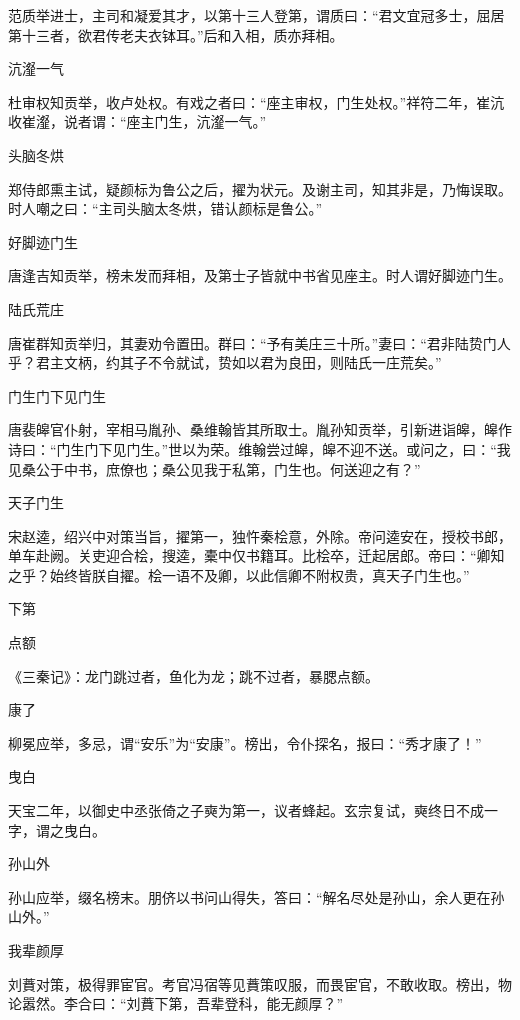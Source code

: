 \documentclass[a4paper,12pt,UTF8,twoside]{ctexbook}
\begin{document}
    范质举进士，主司和凝爱其才，以第十三人登第，谓质曰：“君文宜冠多士，屈居第十三者，欲君传老夫衣钵耳。”后和入相，质亦拜相。
    
    沆瀣一气
    
    杜审权知贡举，收卢处权。有戏之者曰：“座主审权，门生处权。”祥符二年，崔沆收崔瀣，说者谓：“座主门生，沆瀣一气。”
    
    头脑冬烘
    
    郑侍郎熏主试，疑颜标为鲁公之后，擢为状元。及谢主司，知其非是，乃悔误取。时人嘲之曰：“主司头脑太冬烘，错认颜标是鲁公。”
    
    好脚迹门生
    
    唐逢吉知贡举，榜未发而拜相，及第士子皆就中书省见座主。时人谓好脚迹门生。
    
    陆氏荒庄
    
    唐崔群知贡举归，其妻劝令置田。群曰：“予有美庄三十所。”妻曰：“君非陆贽门人乎？君主文柄，约其子不令就试，贽如以君为良田，则陆氏一庄荒矣。”
    
    门生门下见门生
    
    唐裴皞官仆射，宰相马胤孙、桑维翰皆其所取士。胤孙知贡举，引新进诣皞，皞作诗曰：“门生门下见门生。”世以为荣。维翰尝过皞，皞不迎不送。或问之，曰：“我见桑公于中书，庶僚也；桑公见我于私第，门生也。何送迎之有？”
    
    天子门生
    
    宋赵逵，绍兴中对策当旨，擢第一，独忤秦桧意，外除。帝问逵安在，授校书郎，单车赴阙。关吏迎合桧，搜逵，橐中仅书籍耳。比桧卒，迁起居郎。帝曰：“卿知之乎？始终皆朕自擢。桧一语不及卿，以此信卿不附权贵，真天子门生也。”
    
    下第
    
    点额
    
    《三秦记》：龙门跳过者，鱼化为龙；跳不过者，暴腮点额。
    
    康了
    
    柳冕应举，多忌，谓“安乐”为“安康”。榜出，令仆探名，报曰：“秀才康了！”
    
    曳白
    
    天宝二年，以御史中丞张倚之子奭为第一，议者蜂起。玄宗复试，奭终日不成一字，谓之曳白。
    
    孙山外
    
    孙山应举，缀名榜末。朋侪以书问山得失，答曰：“解名尽处是孙山，余人更在孙山外。”
    
    我辈颜厚
    
    刘蕡对策，极得罪宦官。考官冯宿等见蕡策叹服，而畏宦官，不敢收取。榜出，物论嚣然。李合曰：“刘蕡下第，吾辈登科，能无颜厚？”
    
\end{document}

